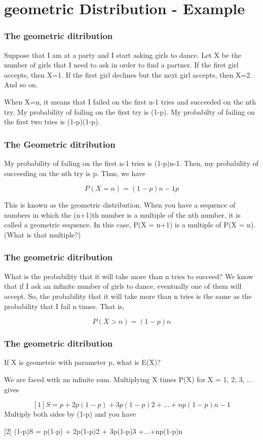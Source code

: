 \documentclass[12pt]{beamer}
\begin{document}
\section{geometric Distribution - Example}
\begin{frame}
\frametitle{The geometric ditribution}

Suppose that I am at a party and I start asking girls to dance. Let X be the number of girls that I need to ask in order to find a partner. If the first girl accepts, then X=1. If the first girl declines but the next girl accepts, then X=2. And so on. 

When X=n, it means that I failed on the first n-1 tries and succeeded on the nth try. My probability of failing on the first try is (1-p). My probabilty of failing on the first two tries is (1-p)(1-p). 
\end{frame}
\begin{frame}
\frametitle{The Geometric ditribution}
My probability of failing on the first n-1 tries is (1-p)n-1. Then, my probability of succeeding on the nth try is p. Thus, we have 

\[ P(X = n) = (1-p)n-1p \]

This is known as the geometric distribution. When you have a sequence of numbers in which the (n+1)th number is a multiple of the nth number, it is called a geometric sequence. In this case, P(X = n+1) is a multiple of P(X = n). (What is that multiple?) 
\end{frame}
\begin{frame}
\frametitle{The geometric ditribution}
What is the probability that it will take more than n tries to succeed? We know that if I ask an infinite number of girls to dance, eventually one of them will accept. So, the probability that it will take more than n tries is the same as the probability that I fail n times. That is, 

\[ P(X > n) = (1-p)n \]
\end{frame}
\begin{frame}
\frametitle{The geometric ditribution}
If X is geometric with parameter p, what is E(X)? 

We are faced with an infinite sum. Multiplying X times P(X) for X = 1, 2, 3, ... gives 

\[
[1] S = p + 2p(1-p) + 3p(1-p)2 +...+np(1-p)n-1 
\]
Multiply both sides by (1-p) and you have

[2] (1-p)S = p(1-p) + 2p(1-p)2 + 3p(1-p)3 +...+np(1-p)n 
\end{frame}
\end{document}
